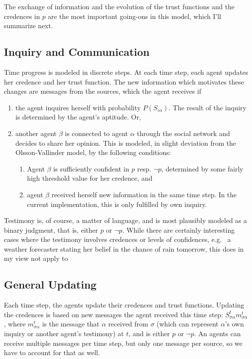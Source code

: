 \documentclass[11pt, a4paper]{scrartcl}
\newcommand{\Stsa}{S^t_{\sigma\alpha}}
\newcommand{\sa}{{\sigma\alpha}}
\begin{document}
The exchange of information and the evolution of the trust functions and the credences in $p$ are the most important going-ons in this model, which I'll summarize next.

\subsection{Inquiry and Communication} 

Time progress is modeled in discrete steps. At each time step, each agent updates her credence and her trust function. The new information which motivates these changes are messages from the sources, which the agent receives if
\begin{enumerate}[label = (\roman*)]
    \item the agent inquires herself with probability $P(S_{\iota\alpha})$. The result of the inquiry is determined by the agent's aptitude. Or,
    \item another agent $\beta$ is connected to agent $\alpha$ through the social network and decides to share her opinion. This is modeled, in slight deviation from the Olsson-Vallinder model, by the following conditions: 
        \begin{enumerate}[label = (\alph*)]
            \item Agent $\beta$ is sufficiently confident in $p$ resp. $\neg p$, determined by some fairly high threshold value for her credence, and
            \item agent $\beta$ received herself new information in the same time step. In the current implementation, this is only fulfilled by own inquiry.  
        \end{enumerate}
\end{enumerate}

Testimony is, of course, a matter of language, and is most plausibly modeled as a binary judgment, that is, either $p$ or $\neg p$. While there are certainly interesting cases where the testimony involves credences or levels of confidences, e.g. \ a weather forecaster stating her belief in the chance of rain tomorrow, this does in my view not apply to  

\subsection{General Updating}

Each time step, the agents update their credences and trust functions. Updating the credences is based on new messages the agent received this time step: $\Stsa m^t_{\sa}$, where $m^t_{\sa}$ is the message that $\alpha$ received from $\sigma$ (which can represent $\alpha$'s own inquiry or another agent's testimony) at $t$, and is either $p$ or $\neg p$. An agents can receive multiple messages per time step, but only one message per source, so we have to account for that as well. 
\end{document}

